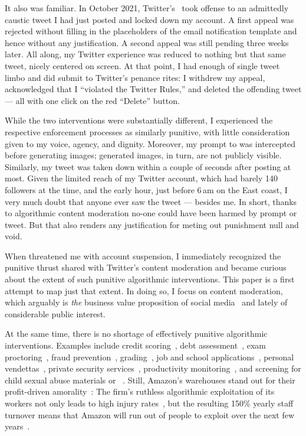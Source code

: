 It also was familiar. In October 2021, Twitter's \AI\ took offense to an
admittedly caustic tweet I had just posted and locked down my account. A first
appeal was rejected without filling in the placeholders of the email
notification template and hence without any justification. A second appeal was
still pending three weeks later. All along, my Twitter experience was reduced to
nothing but that same tweet, nicely centered on screen. At that point, I had
enough of single tweet limbo and did submit to Twitter's penance rites: I
withdrew my appeal, acknowledged that I ``violated the Twitter Rules,'' and
deleted the offending tweet --- all with one click on the red ``Delete'' button.

While the two interventions were substantially different, I experienced the
respective enforcement processes as similarly punitive, with little
consideration given to my voice, agency, and dignity. Moreover, my prompt to
\DALLE{} was intercepted before generating images; generated images, in turn, are
not publicly visible. Similarly, my tweet was taken down within a couple of
seconds after posting at most. Given the limited reach of my Twitter account,
which had barely 140 followers at the time, and the early hour, just before
6$\,$am on the East coast, I very much doubt that anyone ever saw the tweet ---
besides me. In short, thanks to algorithmic content moderation no-one could have
been harmed by prompt or tweet. But that also renders any justification for
meting out punishment null and void.

When \DALLE{} threatened me with account suspension, I immediately recognized
the punitive thrust shared with Twitter's content moderation and became curious
about the extent of such punitive algorithmic interventions. This paper is a
first attempt to map just that extent. In doing so, I focus on content
moderation, which arguably is \emph{the} business value proposition of social
media~\cite{Masnick2022a,Patel2022a} and lately of considerable public interest.

At the same time, there is no shortage of effectively punitive algorithmic
interventions. Examples include credit scoring~\cite{Anonymous2018}, debt
assessment~\cite{Yampolskiy2015}, exam proctoring~\cite{FrancisWard2021b}, fraud
prevention~\cite{Kugel2022}, grading~\cite{Lam2020}, job and school
applications~\cite{Anonymous2016,Hall2012,Hall2020a,Stockton2020}, personal
vendettas~\cite{Casovan2022}, private security services~\cite{HaoSwart2022},
productivity
monitoring~\cite{Covert2022,HaoFreischlad2022,KantorSundaramea2022,Rosenblat2018},
and screening for child sexual abuse materials or \CSAM~\cite{Atherton2022a}.
Still, Amazon's warehouses stand out for their profit-driven
amorality~\cite{KantorWeiseea2021,Lennard2020}: The firm's ruthless algorithmic
exploitation of its workers not only leads to high injury
rates~\cite{Brown2019a,Clark2023,Sainato2021}, but the resulting 150\% yearly
staff turnover means that Amazon will run out of people to exploit over the next
few years~\cite{Sainato2022}.

